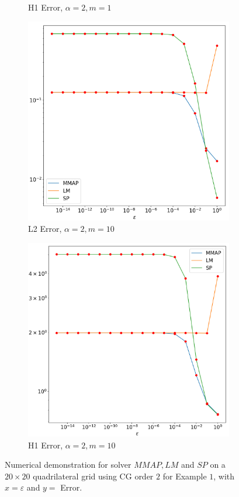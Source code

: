 \documentclass[12pt]{ociamthesis}
\begin{document}
\begin{figure}[H]
\begin{subfigure}{0.42\textwidth}
     \caption{H1 Error, $\alpha=2, m=1$}
 \end{subfigure}
 \begin{subfigure}{0.42\textwidth}
     \includegraphics[width=\textwidth]{Pics/LHSims/E1c_MMAP_LM_SPL2.png}
     \caption{L2 Error, $\alpha=2, m=10$}
 \end{subfigure}
 \hfill
 \begin{subfigure}{0.42\textwidth}
     \includegraphics[width=\textwidth]{Pics/LHSims/E1c_MMAP_LM_SPH1.png}
     \caption{H1 Error, $\alpha=2, m=10$}
 \end{subfigure}
 \caption{Numerical demonstration for solver $MMAP, LM$ and $SP$ on a $20\times 20$ quadrilateral grid using CG order $2$ for Example $1$, with $x=\varepsilon$ and $y=$ Error.} \label{E1_LM_SP}
\end{figure}
\end{document}
